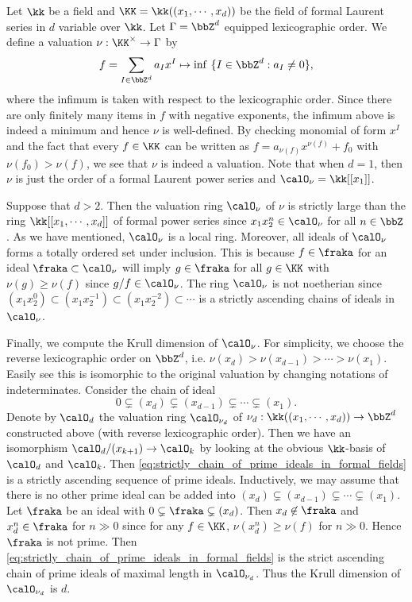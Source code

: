 \begin{example}\label{eg:monomial_valuation}
	Let $\kk$ be a field and $\KK = \kk((x_1,\cdots,x_d))$ be the field of formal Laurent series in $d$ variable over $\kk$.
	Let $\Gamma = \bbZ^d$ equipped lexicographic order.
	We define a valuation $\nu: \KK^\times \to \Gamma$ by
	\[ f = \sum_{I \in \bbZ^d} a_I x^I \mapsto \inf \ \{I \in \bbZ^d : a_I \neq 0\}, \]
	where the infimum is taken with respect to the lexicographic order.
	Since there are only finitely many items in $f$ with negative exponents, the infimum above is indeed a minimum and hence $\nu$ is well-defined.
	By checking monomial of form $x^I$ and the fact that every $f \in \KK$ can be written as $f = a_{\nu(f)} x^{\nu(f)} + f_0$ with $\nu(f_0) > \nu(f)$, we see that $\nu$ is indeed a valuation.
	Note that when $d = 1$, then $\nu$ is just the order of a formal Laurent power series and $\calO_\nu = \kk[[x_1]]$.

	Suppose that $d > 2$.
	Then the valuation ring $\calO_\nu$ of $\nu$ is strictly large than the ring $\kk[[x_1,\cdots,x_d]]$ of formal power series since $x_1x_2^{n} \in \calO_\nu$ for all $n \in \bbZ$.
	As we have mentioned, $\calO_\nu$ is a local ring.
	Moreover, all ideals of $\calO_\nu$ forms a totally ordered set under inclusion.
	This is because $f \in \fraka$ for an ideal $\fraka \subset \calO_\nu$ will imply $g \in \fraka$ for all $g \in \KK$ with $\nu(g) \geq \nu(f)$ since $g/f \in \calO_\nu$.
	The ring $\calO_\nu$ is not noetherian since $(x_1x_2^{0}) \subset (x_1x_2^{-1}) \subset (x_1x_2^{-2}) \subset \cdots$ is a strictly ascending chains of ideals in $\calO_\nu$.

	Finally, we compute the Krull dimension of $\calO_{\nu}$.
	For simplicity, we choose the reverse lexicographic order on $\bbZ^d$, i.e. $\nu(x_d) > \nu(x_{d-1}) > \cdots > \nu(x_1)$.
	Easily see this is isomorphic to the original valuation by changing notations of indeterminates.
	Consider the chain of ideal
	\begin{equation}\label{eq:strictly_chain_of_prime_ideals_in_formal_fields}
		0 \subsetneq (x_d) \subsetneq (x_{d-1}) \subsetneq \cdots \subsetneq (x_1).
	\end{equation}
	Denote by $\calO_d$ the valuation ring $\calO_{\nu_d}$ of $\nu_d: \kk((x_1,\cdots,x_d)) \to \bbZ^d$ constructed above (with reverse lexicographic order).
	Then we have an isomorphism $\calO_d/(x_{k+1}) \to \calO_{k}$ by looking at the obvious $\kk$-basis of $\calO_d$ and $\calO_{k}$.
	Then \cref{eq:strictly_chain_of_prime_ideals_in_formal_fields} is a strictly ascending sequence of prime ideals.
	Inductively, we may assume that there is no other prime ideal can be added into $(x_d) \subsetneq (x_{d-1}) \subsetneq \cdots \subsetneq (x_1)$.
	Let $\fraka$ be an ideal with $0 \subsetneq \fraka \subsetneq (x_d)$.
	Then $x_d \not\in \fraka$ and $x_d^n \in \fraka$ for $n \gg 0$ since for any $f \in \KK$, $\nu(x_d^n) \geq \nu(f)$ for $n \gg 0$.
	Hence $\fraka$ is not prime.
	Then \cref{eq:strictly_chain_of_prime_ideals_in_formal_fields} is the strict ascending chain of prime ideals of maximal length in $\calO_{\nu_d}$.
	Thus the Krull dimension of $\calO_{\nu_d}$ is $d$.
\end{example}

